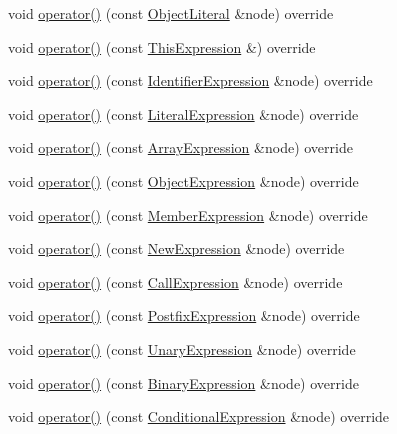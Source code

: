 \begin{DoxyCompactItemize}
\item 
void \hyperlink{struct_basic_visitor_a1f0d676e1575a8efa7fd7149ef9d93be}{operator()} (const \hyperlink{struct_object_literal}{Object\+Literal} \&node) override
\item 
void \hyperlink{struct_basic_visitor_aa3811d723e70227de815461380d861c9}{operator()} (const \hyperlink{struct_this_expression}{This\+Expression} \&) override
\item 
void \hyperlink{struct_basic_visitor_a453bc258129808d4e1e1efefcfa893a0}{operator()} (const \hyperlink{struct_identifier_expression}{Identifier\+Expression} \&node) override
\item 
void \hyperlink{struct_basic_visitor_af86e1dfc1fb346b3dd94a63b6017f4d4}{operator()} (const \hyperlink{struct_literal_expression}{Literal\+Expression} \&node) override
\item 
void \hyperlink{struct_basic_visitor_a1b0936671dd80c4e4ce029e41b216ba6}{operator()} (const \hyperlink{struct_array_expression}{Array\+Expression} \&node) override
\item 
void \hyperlink{struct_basic_visitor_a2bdc5b88714c947eb15d5530240c660c}{operator()} (const \hyperlink{struct_object_expression}{Object\+Expression} \&node) override
\item 
void \hyperlink{struct_basic_visitor_a74c4ab927dc2907784f886245a29296b}{operator()} (const \hyperlink{struct_member_expression}{Member\+Expression} \&node) override
\item 
void \hyperlink{struct_basic_visitor_ab73b6e87ae7344434aa833bd93f4480b}{operator()} (const \hyperlink{struct_new_expression}{New\+Expression} \&node) override
\item 
void \hyperlink{struct_basic_visitor_a455b2414d59a21bae802bd8b20544252}{operator()} (const \hyperlink{struct_call_expression}{Call\+Expression} \&node) override
\item 
void \hyperlink{struct_basic_visitor_ac7e33b8e36fa46d32e3cf517bf9de9bb}{operator()} (const \hyperlink{struct_postfix_expression}{Postfix\+Expression} \&node) override
\item 
void \hyperlink{struct_basic_visitor_a3ae4c9623d2f589f6f026833a7c1dd13}{operator()} (const \hyperlink{struct_unary_expression}{Unary\+Expression} \&node) override
\item 
void \hyperlink{struct_basic_visitor_a9433a6a9dcdd64f97ea1c392208a3305}{operator()} (const \hyperlink{struct_binary_expression}{Binary\+Expression} \&node) override
\item 
void \hyperlink{struct_basic_visitor_ab121f54f6337dc726745c65f47812d8d}{operator()} (const \hyperlink{struct_conditional_expression}{Conditional\+Expression} \&node) override

\end{DoxyCompactItemize}
